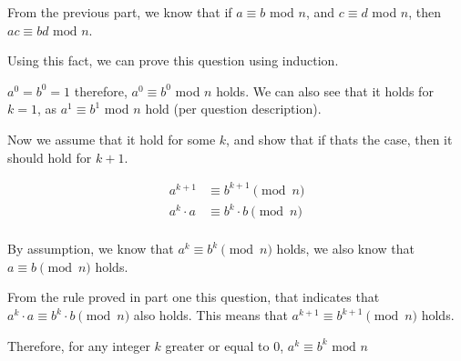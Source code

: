 \documentclass[12pt]{article} %
\begin{document}
\begin{homeworkProblem}
    From the previous part, we know that if $a \equiv b$ mod $n$, and $c \equiv d$ mod $n$, then $ac \equiv bd \text{ mod } n$.

    Using this fact, we can prove this question using induction.

    $a^0 = b^0 = 1$ therefore, $a^0 \equiv b^0$ mod $n$ holds. We can also see that it holds for $k = 1$,
    as  $a^1 \equiv b^1$ mod $n$ hold (per question description).

    Now we assume that it hold for some $k$, and show that if thats the case, then it should hold for $k + 1$.

    \begin{align*}
        a^{k + 1}   & \equiv b^{k + 1} \pmod{n}   \\
        a^k \cdot a & \equiv b^k \cdot b \pmod{n} \\
    \end{align*}

    By assumption, we know that $a^k \equiv b^k \pmod{n}$ holds, we also know that $a \equiv b \pmod{n}$ holds.

    From the rule proved in part one this question, that indicates that $a^k \cdot a \equiv b^k \cdot b \pmod{n}$ also holds. This means that
    $a^{k + 1} \equiv b^{k + 1} \pmod{n}$ holds.

    Therefore, for any integer $k$ greater or equal to 0, $a^k \equiv b^k \text{ mod } n$



\end{homeworkProblem}
\end{document}
